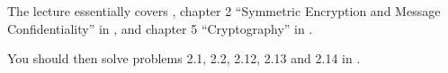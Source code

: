 The lecture essentially covers  \cite{Bosk2013itn}, 
chapter 2 ``\foreignlanguage{english}{Symmetric Encryption and Message 
Confidentiality}'' in  \cite{Stallings2013nse}, and 
chapter 5 ``\foreignlanguage{english}{Cryptography}'' in 
 \cite{Anderson2008sea}.

You should then solve problems 2.1, 2.2, 2.12, 2.13 and 2.14 in 
\cite{Stallings2013nse}.
